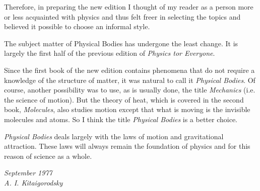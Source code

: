 Therefore, in preparing the new edition I thought of my reader as a
person more or less acquainted with physics and thus felt freer in
selecting the topics and believed it possible to choose an informal
style.  

The subject matter of Physical Bodies has undergone the least
change. It is largely the first half of the previous edition of
\emph{Physics tor Everyone}. 

Since the first book of the new edition contains phenomena that do not
require a knowledge of the structure of matter, it was natural to call
it \emph{Physical Bodies}. Of course, another possibility was to use,
as is usually done, the title \emph{Mechanics} (i.e. the science of
motion). But the theory of heat, which is covered in the second book,
\emph{Molecules}, also studies motion except that what is moving is
the invisible molecules and atoms. So I think the title \emph{Physical
  Bodies} is a better choice.

\emph{Physical Bodies} deals largely with the laws of motion and
gravitational attraction. These laws will always remain the
foundation of physics and for this reason of science as a whole.
\begin{flushright}
 \emph{September 1977\\
A. I. Kitaigorodsky}
\end{flushright}

\clearpage
